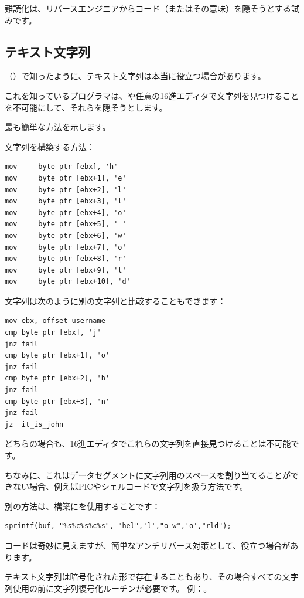 
難読化は、リバースエンジニアからコード（またはその意味）を隠そうとする試みです。

\subsection{テキスト文字列}

（）で知ったように、テキスト文字列は本当に役立つ場合があります。

これを知っているプログラマは、\IDA{}や任意の16進エディタで文字列を見つけることを不可能にして、それらを隠そうとします。

最も簡単な方法を示します。

文字列を構築する方法：

\begin{lstlisting}[style=customasmx86]
mov     byte ptr [ebx], 'h'
mov     byte ptr [ebx+1], 'e'
mov     byte ptr [ebx+2], 'l'
mov     byte ptr [ebx+3], 'l'
mov     byte ptr [ebx+4], 'o'
mov     byte ptr [ebx+5], ' '
mov     byte ptr [ebx+6], 'w'
mov     byte ptr [ebx+7], 'o'
mov     byte ptr [ebx+8], 'r'
mov     byte ptr [ebx+9], 'l'
mov     byte ptr [ebx+10], 'd'
\end{lstlisting}

文字列は次のように別の文字列と比較することもできます：

\begin{lstlisting}[style=customasmx86]
mov	ebx, offset username
cmp	byte ptr [ebx], 'j'
jnz	fail
cmp	byte ptr [ebx+1], 'o'
jnz	fail
cmp	byte ptr [ebx+2], 'h'
jnz	fail
cmp	byte ptr [ebx+3], 'n'
jnz	fail
jz	it_is_john
\end{lstlisting}

どちらの場合も、16進エディタでこれらの文字列を直接見つけることは不可能です。


ちなみに、これはデータセグメントに文字列用のスペースを割り当てることができない場合、例えば\ac{PIC}やシェルコードで文字列を扱う方法です。

別の方法は、構築にを使用することです：

\begin{lstlisting}[style=customc]
sprintf(buf, "%s%c%s%c%s", "hel",'l',"o w",'o',"rld");
\end{lstlisting}

コードは奇妙に見えますが、簡単なアンチリバース対策として、役立つ場合があります。

テキスト文字列は暗号化された形で存在することもあり、その場合すべての文字列使用の前に文字列復号化ルーチンが必要です。
例：。

